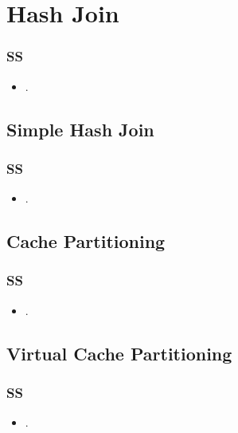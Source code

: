 \section{Hash Join}

\begin{frame}
\frametitle{SS}

\begin{itemize}
\item .
\end{itemize}

\end{frame}

\subsection{Simple Hash Join}
\begin{frame}
\frametitle{SS}

\begin{itemize}
\item .
\end{itemize}

\end{frame}


\subsection{Cache Partitioning}

\begin{frame}
\frametitle{SS}

\begin{itemize}
\item .
\end{itemize}

\end{frame}



\subsection{Virtual Cache Partitioning}

\begin{frame}
\frametitle{SS}

\begin{itemize}
\item .
\end{itemize}

\end{frame}
